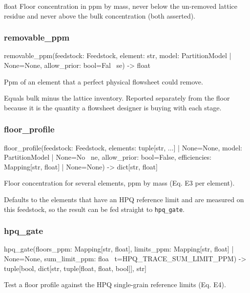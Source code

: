 \documentclass[10pt,a4paper,twoside]{report}
\begin{document}
float Floor concentration in ppm by mass, never below the un-removed lattice residue and never above the bulk concentration (both asserted).

\subsubsection*{removable\_ppm}

\begin{verbatimsmall}
removable_ppm(feedstock: Feedstock, element: str, model: PartitionModel | None=None, allow_prior: bool=Fal
    \ se) -> float
\end{verbatimsmall}

Ppm of an element that a perfect physical flowsheet could remove.

Equals bulk minus the lattice inventory. Reported separately from the floor because it is the quantity a flowsheet designer is buying with each stage.

\subsubsection*{floor\_profile}

\begin{verbatimsmall}
floor_profile(feedstock: Feedstock, elements: tuple[str, ...] | None=None, model: PartitionModel | None=No
    \ ne, allow_prior: bool=False, efficiencies: Mapping[str, float] | None=None) -> dict[str, float]
\end{verbatimsmall}

Floor concentration for several elements, ppm by mass (Eq. E3 per element).

Defaults to the elements that have an HPQ reference limit and are measured on this feedstock, so the result can be fed straight to \texttt{hpq\_gate}.

\subsubsection*{hpq\_gate}

\begin{verbatimsmall}
hpq_gate(floors_ppm: Mapping[str, float], limits_ppm: Mapping[str, float] | None=None, sum_limit_ppm: floa
    \ t=HPQ_TRACE_SUM_LIMIT_PPM) -> tuple[bool, dict[str, tuple[float, float, bool]], str]
\end{verbatimsmall}

Test a floor profile against the HPQ single-grain reference limits (Eq. E4).
\end{document}
